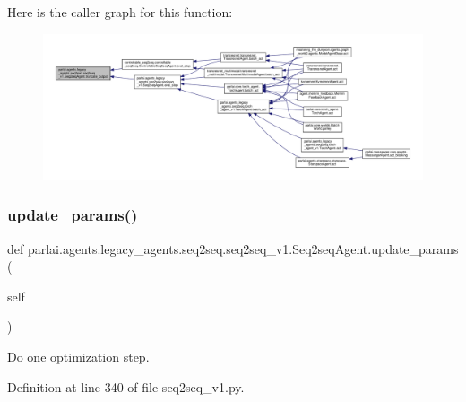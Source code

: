 Here is the caller graph for this function\+:
\nopagebreak
\begin{figure}[H]
\begin{center}
\leavevmode
\includegraphics[width=350pt]{classparlai_1_1agents_1_1legacy__agents_1_1seq2seq_1_1seq2seq__v1_1_1Seq2seqAgent_a4567d7a200e20bd09235d4833424bdad_icgraph}
\end{center}
\end{figure}
\mbox{\label{classparlai_1_1agents_1_1legacy__agents_1_1seq2seq_1_1seq2seq__v1_1_1Seq2seqAgent_a3fabaacec11534b452a1786d3dd5a6c8}} 
\subsubsection{\texorpdfstring{update\+\_\+params()}{update\_params()}}
{\footnotesize\ttfamily def parlai.\+agents.\+legacy\+\_\+agents.\+seq2seq.\+seq2seq\+\_\+v1.\+Seq2seq\+Agent.\+update\+\_\+params (\begin{DoxyParamCaption}\item[{}]{self }\end{DoxyParamCaption})}

\begin{DoxyVerb}Do one optimization step.\end{DoxyVerb}
 

Definition at line 340 of file seq2seq\+\_\+v1.\+py.




